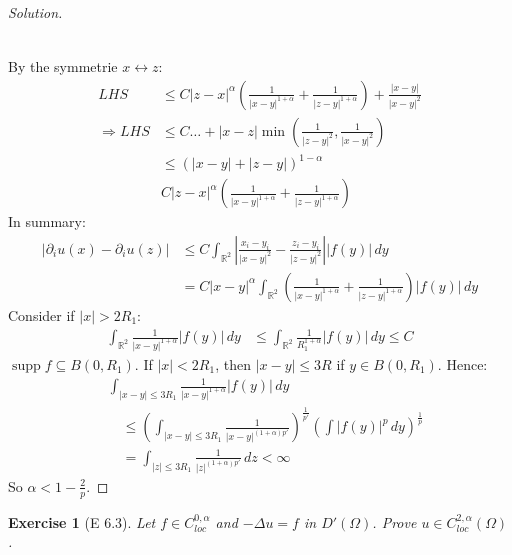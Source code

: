 \documentclass{report}
\theoremstyle{tommy}
\newtheorem{ex}[defn]{Exercise}
\newcommand{\supp}{\operatorname{supp}}
\begin{document}
\begin{proof}[Solution]
\begin{enumerate}
\begin{align*}
      \end{align*}
    \end{enumerate}
    By the symmetrie \(x \leftrightarrow z\):
    \begin{align*}
      LHS &\le C|z-x|^\alpha \left(\frac{1}{|x-y|^{1 + \alpha}} + \frac{1}{|z-y|^{1+\alpha}}\right) + \frac{|x-y|}{|x-y|^2} \\
      \Rightarrow LHS &\le C \dots + |x-z| \min\left(\frac{1}{|z-y|^2}, \frac{1}{|x-y|^2}\right) \\
      & \le (|x-y| + |z-y|)^{1-\alpha} \\
      & C |z-x|^\alpha \left(\frac{1}{|x-y|^{1+\alpha}} + \frac{1}{|z-y|^{1+\alpha}}\right)
    \end{align*}
    In summary:
    \begin{align*}
      |\partial_i u(x) - \partial_i u(z)| 
      &\le C \int_{\mathbb{R}^2} \left| \frac{x_i - y_i}{|x-y|^2} - \frac{z_i - y_i}{|z-y|^2}\right||f(y)| \, dy \\
      &= C |x-y|^\alpha \int_{\mathbb{R}^2} \left(\frac{1}{|x-y|^{1+\alpha}} + \frac{1}{|z-y|^{1+\alpha}}\right) |f(y)| \, dy
    \end{align*}
    Consider if \(|x| > 2 R_1\):
    \begin{align*}
      \int_{\mathbb{R}^2} \frac{1}{|x-y|^{1+\alpha}} |f(y)| \, dy 
      &\le \int_{\mathbb{R}^2} \frac{1}{R_1^{1+\alpha}} |f(y)| \, dy \le C
    \end{align*}
    \(\supp f \subseteq B(0, R_1)\). If \(|x| < 2 R_1\), then \(|x-y| \le 3R\) if \(y \in B(0, R_1)\). Hence:
    \begin{align*}
      &\int_{|x-y| \le 3 R_1} \frac{1}{|x-y|^{1+\alpha}} |f(y)| \, dy \\
      &\quad \le \left(\int_{|x-y| \le 3 R_1} \frac{1}{|x-y|^{(1+\alpha)p'}}\right)^{\frac{1}{p'}} \left(\int |f(y)|^p \, dy\right)^{\frac{1}{p}} \\
      &\quad= \int_{|z| \le 3 R_1} \frac{1}{|z|^{(1+\alpha)p'}} \,dz < \infty
    \end{align*}
    So \(\alpha < 1 - \frac{2}{p}\).
  \end{proof}

  \begin{ex}[E 6.3]  
    Let \(f \in C_{loc}^{0,\alpha}\) and \(- \Delta u = f\) in \(D'(\Omega)\). Prove \(u \in C_{loc}^{2, \alpha}(\Omega)\).
  \end{ex}
\end{document}
